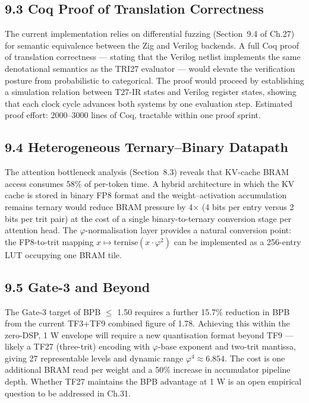 \subsection{9.3 Coq Proof of Translation
Correctness}\label{fa_28:sec:future-coq}

The current implementation relies on differential fuzzing
(Section~9.4 of Ch.27) for semantic equivalence between the Zig and
Verilog backends. A full Coq proof of translation correctness ---
stating that the Verilog netlist implements the same denotational
semantics as the TRI27 evaluator --- would elevate the verification
posture from probabilistic to categorical. The proof would proceed by
establishing a simulation relation between T27-IR states and Verilog
register states, showing that each clock cycle advances both systems by
one evaluation step. Estimated proof effort: 2000--3000 lines of Coq,
tractable within one proof sprint.

\subsection{9.4 Heterogeneous Ternary--Binary
Datapath}\label{fa_28:sec:future-heterogeneous}

The attention bottleneck analysis (Section~8.3) reveals that KV-cache
BRAM access consumes 58\% of per-token time. A hybrid architecture in
which the KV cache is stored in binary FP8 format and the
weight--activation accumulation remains ternary would reduce BRAM
pressure by 4$\times$ (4 bits per entry versus 2 bits per trit pair)
at the cost of a single binary-to-ternary conversion stage per
attention head. The $\varphi$-normalisation layer provides a natural
conversion point: the FP8-to-trit mapping $x \mapsto
\mathrm{ternise}(x \cdot \varphi^2)$ can be implemented as a 256-entry
LUT occupying one BRAM tile.

\subsection{9.5 Gate-3 and Beyond}\label{fa_28:sec:future-gate3}

The Gate-3 target of BPB $\leq$ 1.50 requires a further 15.7\%
reduction in BPB from the current TF3+TF9 combined figure of 1.78.
Achieving this within the zero-DSP, 1 W envelope will require a new
quantisation format beyond TF9 --- likely a TF27 (three-trit) encoding
with $\varphi$-base exponent and two-trit mantissa, giving 27
representable levels and dynamic range $\varphi^4 \approx 6.854$. The
cost is one additional BRAM read per weight and a 50\% increase in
accumulator pipeline depth. Whether TF27 maintains the BPB advantage at
1 W is an open empirical question to be addressed in Ch.31.


